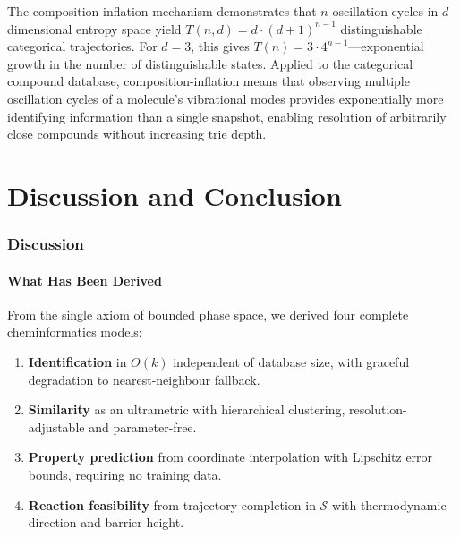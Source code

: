 \documentclass[11pt,twocolumn,a4paper]{article}
\theoremstyle{definition}
\theoremstyle{remark}
\newcommand{\Sspace}{\mathcal{S}}
\begin{document}
The composition-inflation mechanism \citep{sachikonye2025d} demonstrates that $n$ oscillation cycles in $d$-dimensional entropy space yield $T(n,d) = d \cdot (d+1)^{n-1}$ distinguishable categorical trajectories. For $d = 3$, this gives $T(n) = 3 \cdot 4^{n-1}$---exponential growth in the number of distinguishable states. Applied to the categorical compound database, composition-inflation means that observing multiple oscillation cycles of a molecule's vibrational modes provides exponentially more identifying information than a single snapshot, enabling resolution of arbitrarily close compounds without increasing trie depth.



\part{Discussion and Conclusion}

\section{Discussion}
\label{sec:discussion}

\subsection{What Has Been Derived}

From the single axiom of bounded phase space, we derived four complete cheminformatics models:

\begin{enumerate}[nosep]
\item \textbf{Identification} in $O(k)$ independent of database size, with graceful degradation to nearest-neighbour fallback.
\item \textbf{Similarity} as an ultrametric with hierarchical clustering, resolution-adjustable and parameter-free.
\item \textbf{Property prediction} from coordinate interpolation with Lipschitz error bounds, requiring no training data.
\item \textbf{Reaction feasibility} from trajectory completion in $\Sspace$ with thermodynamic direction and barrier height.
\end{enumerate}
\end{document}
